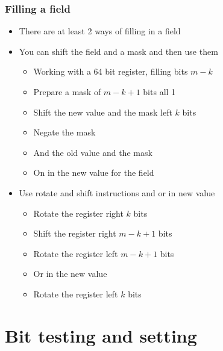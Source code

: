 \documentclass{beamer}
\begin{document}
\begin{frame}
    \frametitle{Filling a field}
    \begin{itemize}
        \item There are at least 2 ways of filling in a field
        \item You can shift the field and a mask and then use them
        \begin{itemize}
            \item Working with a 64 bit register, filling bits $m-k$
            \item Prepare a mask of $m-k+1$ bits all 1
            \item Shift the new value and the mask left $k$ bits
            \item Negate the mask
            \item And the old value and the mask
            \item On in the new value for the field
        \end{itemize}
        \item Use rotate and shift instructions and or in new value
        \begin{itemize}
            \item Rotate the register right $k$ bits
            \item Shift the register right $m-k+1$ bits
            \item Rotate the register left $m-k+1$ bits
            \item Or in the new value
            \item Rotate the register left $k$ bits
        \end{itemize}
    \end{itemize}
\end{frame}

\section{Bit testing and setting}
\end{document}
